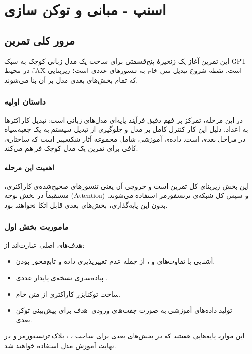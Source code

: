 \documentclass{article}
\begin{document}


\tableofcontents \clearpage
\listoffigures \clearpage
\newpage
\section{اسنپ - مبانی و توکن سازی}
\subsection{مرور کلی تمرین}

این تمرین آغاز یک زنجیرۀ پنج‌قسمتی برای ساخت یک مدل زبانی کوچک به سبک GPT در محیط JAX است. نقطه شروع تبدیل متن خام به تنسورهای عددی است؛ زیربنایی که تمام بخش‌های بعدی مدل بر آن بنا می‌شوند.

\subsubsection*{داستان اولیه}
در این مرحله، تمرکز بر فهم دقیق فرآیند پایه‌ای مدل‌های زبانی است: تبدیل کاراکترها به اعداد. دلیل این کار کنترل کامل بر مدل و جلوگیری از تبدیل سیستم به یک جعبه‌سیاه در مراحل بعدی است. داده‌ی آموزشی شامل مجموعه آثار شکسپیر است که ساختاری کافی برای تمرین یک مدل کوچک فراهم می‌کند.

\paragraph{اهمیت این مرحله}
این بخش زیربنای کل تمرین است و خروجی آن یعنی تنسورهای صحیح‌شده‌ی کاراکتری، مستقیماً در بخش توجه (Attention) و سپس کل شبکه‌ی ترنسفورمر استفاده می‌شوند. بدون این پایه‌گذاری، بخش‌های بعدی قابل اتکا نخواهند بود.

\subsubsection*{ماموریت بخش اول}
هدف‌های اصلی عبارت‌اند از:
\begin{itemize}
	\item آشنایی با تفاوت‌های  و ، از جمله عدم تغییرپذیری داده و تابع‌محور بودن.
	\item پیاده‌سازی نسخه‌ی پایدار عددی .
	\item ساخت توکنایزر کاراکتری از متن خام.
	\item تولید داده‌های آموزشی به صورت جفت‌های ورودی–هدف برای پیش‌بینی توکن بعدی.
\end{itemize}

این موارد پایه‌هایی هستند که در بخش‌های بعدی برای ساخت ، ، بلاک ترنسفورمر و در نهایت آموزش مدل استفاده خواهند شد.
\end{document}
